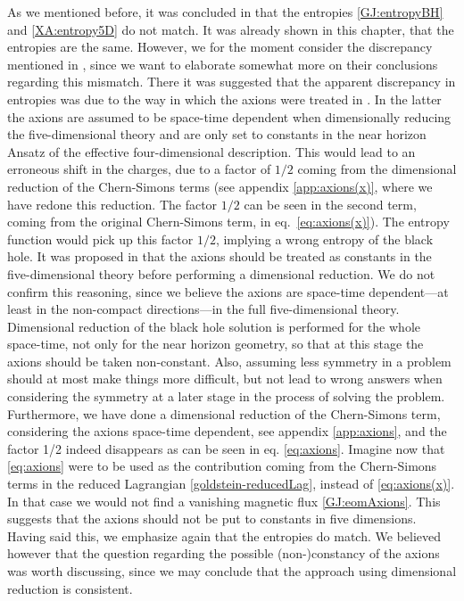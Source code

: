 \documentclass[12pt,twoside]{book}
\begin{document}
As we mentioned before, it was concluded in \cite{Arsiwalla:2008gc} that the entropies \eqref{GJ:entropyBH} and \eqref{XA:entropy5D} do not match. It was already shown in this chapter, that the entropies are the same. However, we for the moment consider the discrepancy mentioned in \cite{Arsiwalla:2008gc}, since we want to elaborate somewhat more on their conclusions regarding this mismatch. There it was suggested that the apparent discrepancy in entropies was due to the way in which the axions were treated in \cite{Goldstein:2007kx}. In the latter the axions are assumed to be space-time dependent when dimensionally reducing the five-dimensional theory and are only set to constants in the near horizon Ansatz of the effective four-dimensional description. This would lead to an erroneous shift in the charges, due to a factor of $1/2$ coming from the dimensional reduction of the Chern-Simons terms (see appendix \ref{app:axions(x)}, where we have redone this reduction. The factor $1/2$ can be seen in the second term, coming from the original Chern-Simons term, in eq.\ \eqref{eq:axions(x)}). The entropy function would pick up this factor $1/2$, implying a wrong entropy of the black hole. It was proposed in \cite{Arsiwalla:2008gc} that the axions should be treated as constants in the five-dimensional theory before performing a dimensional reduction. We do not confirm this reasoning, since we believe the axions are space-time dependent---at least in the non-compact directions---in the full five-dimensional theory. Dimensional reduction of the black hole solution is performed for the whole space-time, not only for the near horizon geometry, so that at this stage the axions should be taken non-constant. Also, assuming less symmetry in a problem should at most make things more difficult, but not lead to wrong answers when considering the symmetry at a later stage in the process of solving the problem. Furthermore, we have done a dimensional reduction of the Chern-Simons term, considering the axions space-time dependent, see appendix \ref{app:axions}, and the factor 1/2 indeed disappears as can be seen in eq. \eqref{eq:axions}. Imagine now that \eqref{eq:axions} were to be used as the contribution coming from the Chern-Simons terms in the reduced Lagrangian \eqref{goldstein-reducedLag}, instead of \eqref{eq:axions(x)}. In that case we would not find a vanishing magnetic flux \eqref{GJ:eomAxions}. This suggests that the axions should not be put to constants in five dimensions. Having said this, we emphasize again that the entropies do match. We believed however that the question regarding the possible (non-)\linebreak[0]constancy of the axions was worth discussing, since we may conclude that the approach using dimensional reduction is consistent. 
\end{document}
